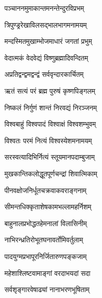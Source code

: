 \renewcommand{\devAya}{ॐ उमामहेश्वराभ्यां नमः}
\begin{center}

{पञ्चाननमुमाकान्तमनन्तेन्दुरविप्रभम्}

{त्रिपुण्ड्ररेखाविलसद्भालभागमनामयम्}

{मन्दस्मितमुखाम्भोजमाधारं जगतां प्रभुम्}

{वेदात्मकं वेदवेद्यं विष्णुब्रह्मादिवन्दितम्}

{अप्रतिद्वन्द्वमद्वन्द्वं सर्ववृन्दारकार्चितम्}

{ऋतं सत्यं परं ब्रह्म पुरुषं कृष्णपिङ्गलम्}

{निष्कलं निर्गुणं शान्तं निरवद्यं निरञ्जनम्}

{विश्वबाहुं विश्वपादं विश्वाक्षं विश्वशम्भुवम्}

{विश्वतः परमं नित्यं विश्वस्येशमनामयम्}

\medskip

{सरस्वत्यादिभिर्नित्यं स्तूयमानपदाम्बुजाम्}

{मुखकान्तिकलोद्धूतपूर्णचन्द्रां शिवात्मिकाम्}

{पीनवक्षोजनिर्धूतचक्रवाकवराङ्गनाम्}

{सीमन्तधिक्कृताशेषकामभल्लामहर्निशम्}

{बाहुनालप्रभोद्धतहेमनालां विलासिनीम्}

{नाभिरन्ध्रतिरोभूतघनावर्तोमिवर्तुलाम्}

{पादयुग्मप्रभापूरनिर्जितारुणपङ्कजाम्}

{महेशाश्लिष्टवामाङ्गां वरदाभयदां सदा}

{सर्वशृङ्गारवेषाढ्यां नानाभरणभूषिताम्}


\end{center}
